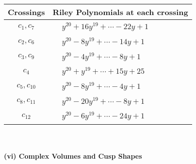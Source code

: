 \documentclass[1p]{elsarticle_modified}
\theoremstyle{definition}
\begin{document}
\begin{tabular}{m{50pt}|m{274pt}}
Crossings & \hspace{64pt}Riley Polynomials at each crossing \\
\hline $$\begin{aligned}c_{1},c_{7}\end{aligned}$$&$\begin{aligned}
&y^{20}+16 y^{19}+\cdots-22 y+1
\end{aligned}$\\
\hline $$\begin{aligned}c_{2},c_{6}\end{aligned}$$&$\begin{aligned}
&y^{20}-8 y^{19}+\cdots-14 y+1
\end{aligned}$\\
\hline $$\begin{aligned}c_{3},c_{9}\end{aligned}$$&$\begin{aligned}
&y^{20}-4 y^{19}+\cdots-8 y+1
\end{aligned}$\\
\hline $$\begin{aligned}c_{4}\end{aligned}$$&$\begin{aligned}
&y^{20}+y^{19}+\cdots+15 y+25
\end{aligned}$\\
\hline $$\begin{aligned}c_{5},c_{10}\end{aligned}$$&$\begin{aligned}
&y^{20}-8 y^{19}+\cdots-4 y+1
\end{aligned}$\\
\hline $$\begin{aligned}c_{8},c_{11}\end{aligned}$$&$\begin{aligned}
&y^{20}-20 y^{19}+\cdots-8 y+1
\end{aligned}$\\
\hline $$\begin{aligned}c_{12}\end{aligned}$$&$\begin{aligned}
&y^{20}-6 y^{19}+\cdots-24 y+1
\end{aligned}$\\
\hline
\end{tabular}\\~\\
\newpage\flushleft \textbf{(vi) Complex Volumes and Cusp Shapes}
\end{document}

